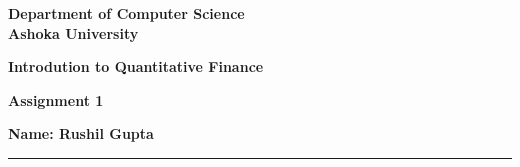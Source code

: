 \documentclass[a4paper]{article}
\begin{document}
\begin{center}
{\large \bf \color{red}  Department of Computer Science} \\
{\large \bf \color{red}  Ashoka University} \\

\vspace{0.1in}

{\large \bf \color{blue}  Introdution to Quantitative Finance}

\vspace{0.05in}

    { \bf \color{YellowOrange} Assignment 1}
\end{center}
\medskip

\hfill {\textbf{Name: Rushil Gupta} }

\bigskip
\hrule


\end{document}
